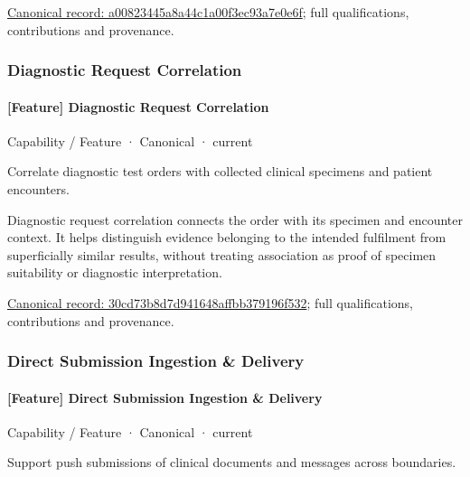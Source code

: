 {\footnotesize \href{../../../../continuum/strategy/capability/feature/a00823445a8a44c1a00f3ec93a7e0e6f.md}{Canonical record: a00823445a8a44c1a00f3ec93a7e0e6f}; full qualifications, contributions and provenance.}\par
\subsubsection{Diagnostic Request Correlation}

\paragraph{[Feature] Diagnostic Request Correlation}

\label{element:30cd73b8d7d941648affbb379196f532}
{\small Capability / Feature · Canonical · current}\par

Correlate diagnostic test orders with collected clinical specimens and patient encounters.



Diagnostic request correlation connects the order with its specimen and encounter context. It helps distinguish evidence belonging to the intended fulfilment from superficially similar results, without treating association as proof of specimen suitability or diagnostic interpretation.


{\footnotesize \href{../../../../continuum/strategy/capability/feature/30cd73b8d7d941648affbb379196f532.md}{Canonical record: 30cd73b8d7d941648affbb379196f532}; full qualifications, contributions and provenance.}\par
\subsubsection{Direct Submission Ingestion \& Delivery}

\paragraph{[Feature] Direct Submission Ingestion \& Delivery}

\label{element:e8bfad88315c4833b6772ef580ca55a5}
{\small Capability / Feature · Canonical · current}\par

Support push submissions of clinical documents and messages across boundaries.



